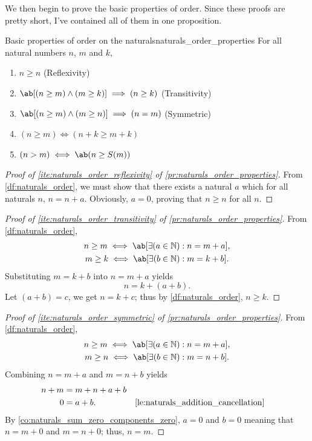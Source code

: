 We then begin to prove the basic properties of order. Since these proofs are pretty short, I've
contained all of them in one proposition.
\begin{prop}{Basic properties of order on the naturals}{naturals_order_properties}
  For all natural numbers \(n\), \(m\) and \(k\),
  \begin{enumerate}[noitemsep]
    \item \(n \geq n\) (Reflexivity) \label{ite:naturals_order_reflexivity}
    \item \(\ab[(n \geq m) \land (m \geq k)] \implies (n \geq k)\) (Transitivity)
          \label{ite:naturals_order_transitivity}
    \item \(\ab[(n \geq m) \land (m \geq n)] \implies (n = m)\) (Symmetric)
          \label{ite:naturals_order_symmetric}
    \item \((n \geq m) \iff (n + k \geq m + k)\) \label{ite:naturals_order_preserve_addition}
    \item \((n > m) \iff \ab(n \geq S(m))\) \label{ite:naturals_order_strict_and_standard}
  \end{enumerate}
\end{prop}
\begin{proof}[Proof of \cref{ite:naturals_order_reflexivity} of \cref{pr:naturals_order_properties}]
  From \cref{df:naturals_order}, we must show that there exists a natural \(a\) which for all
  naturals \(n\), \(n = n + a\). Obviously, \(a = 0\), proving that \(n \geq n\) for all \(n\).
\end{proof}
\begin{proof}[Proof of \cref{ite:naturals_order_transitivity} of \cref{pr:naturals_order_properties}]
  From \cref{df:naturals_order},
  \begin{gather}
    n \geq m \iff \ab[\exists (a \in \mathbb{N}) : n = m + a], \\
    m \geq k \iff \ab[\exists (b \in \mathbb{N}) : m = k + b].
  \end{gather}
  Substituting \(m = k + b\) into \(n = m + a\) yields
  \begin{equation}
    n = k + (a + b).
  \end{equation}
  Let \((a + b) = c\), we get \(n = k + c\); thus by \cref{df:naturals_order}, \(n \geq k\).
\end{proof}
\begin{proof}[Proof of \cref{ite:naturals_order_symmetric} of \cref{pr:naturals_order_properties}]
  From \cref{df:naturals_order},
  \begin{gather}
    n \geq m \iff \ab[\exists (a \in \mathbb{N}) : n = m + a], \\
    m \geq n \iff \ab[\exists (b \in \mathbb{N}) : m = n + b].
  \end{gather}
  Combining \(n = m + a\) and \(m = n + b\) yields
  \begin{align}
    n + m & = m + n + a + b                                                      \\
    0     & = a + b.        &  & \text{\Cref{le:naturals_addition_cancellation}}
  \end{align}
  By \cref{co:naturals_sum_zero_components_zero}, \(a = 0\) and \(b = 0\) meaning that \(n = m + 0\)
  and \(m = n + 0\); thus, \(n = m\).
\end{proof}
